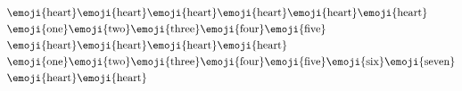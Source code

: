 \documentclass{article}
\begin{document}
\begin{align*}
    &\text{\emoji{heart}} \text{\emoji{heart}} \text{\emoji{heart}} \text{\emoji{heart}} \text{\emoji{heart}} \text{\emoji{heart}}
    \\
    &\text{\emoji{one}} \text{\emoji{two}} \text{\emoji{three}} \text{\emoji{four}} \text{\emoji{five}}\\
    &\text{\emoji{heart}} \text{\emoji{heart}} \text{\emoji{heart}} \text{\emoji{heart}}
    \\
    &\text{\emoji{one}} \text{\emoji{two}} \text{\emoji{three}} \text{\emoji{four}} \text{\emoji{five}} \text{\emoji{six}} \text{\emoji{seven}}\\
    &\text{\emoji{heart}} \text{\emoji{heart}}
\end{align*}
\end{document}

